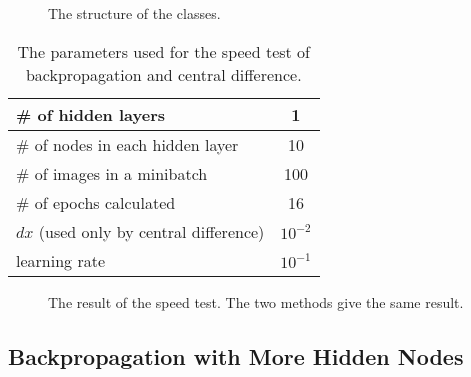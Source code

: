 \documentclass{article}
\theoremstyle{definition}
\begin{document}
\begin{figure}[H]
    \centering
    \begin{subfigure}[H]{1.0\textwidth}
	\end{subfigure}
    \caption{The structure of the classes.}
    \label{fig:4.2}
\end{figure}

\begin{table}[H]
    \centering
    \begin{tabular}{|l|c|} \hline
    \# of hidden layers & 1 \\ \hline
    \# of nodes in each hidden layer & 10 \\ \hline
    \# of images in a minibatch & 100 \\ \hline
    \# of epochs calculated & 16 \\ \hline
    $dx$ (used only by central difference) & $10^{-2}$ \\ \hline
    learning rate & $10^{-1}$ \\ \hline
    \end{tabular}
    \caption{The parameters used for the speed test of backpropagation and central difference.}
    \label{tab:4.2}
\end{table}

\begin{figure}[H]
    \centering
    \begin{subfigure}[H]{1.0\textwidth}
	\end{subfigure}
    \caption{The result of the speed test. The two methods give the same result.}
    \label{fig:4.3}
\end{figure}

\subsection{Backpropagation with More Hidden Nodes}



\newpage


\end{document}
